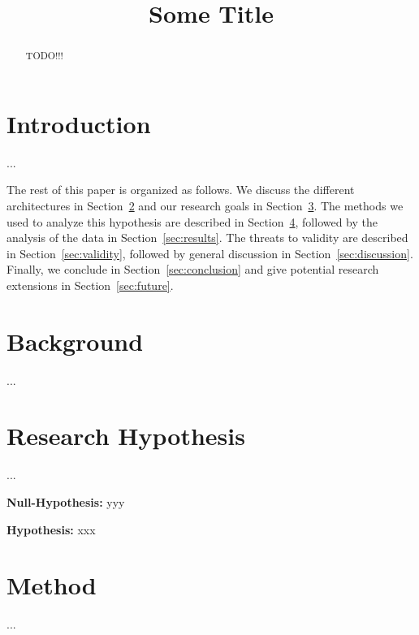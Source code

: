 \documentclass[conference]{IEEEtran}
\begin{document}
\title{Some Title}

\author{
	\and
}

\maketitle
\thispagestyle{plain}
\pagestyle{plain}

\begin{abstract}
TODO!!!
\end{abstract}

\section{Introduction}\label{sec:intro}
...

The rest of this paper is organized as follows.  We discuss the different architectures in Section~\ref{sec:back} and our research goals in Section~\ref{sec:hypothesis}.  The methods we used to analyze this hypothesis are described in Section~\ref{sec:method}, followed by the analysis of the data in Section~\ref{sec:results}.  The threats to validity are described in Section~\ref{sec:validity}, followed by general discussion in Section~\ref{sec:discussion}.  Finally, we conclude in Section~\ref{sec:conclusion} and give potential research extensions in Section~\ref{sec:future}.

\section{Background}\label{sec:back}
...

\section{Research Hypothesis}\label{sec:hypothesis}
...

\vspace{.5em}
\noindent\textbf{Null-Hypothesis:} yyy

\vspace{.5em}
\noindent\textbf{Hypothesis:} xxx

\section{Method}\label{sec:method}
...
\end{document}

